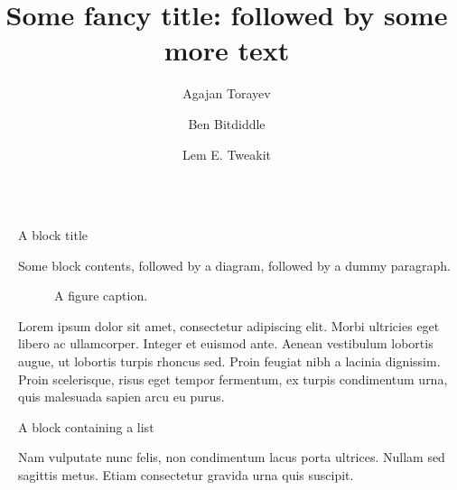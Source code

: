 \documentclass[final]{beamer}
\title{Some fancy title: followed by some more text}
\author{Agajan Torayev \inst{1} \and Ben Bitdiddle \inst{2} \and Lem E. Tweakit \inst{2}}
\institute[shortinst]{\inst{1} Some Institute \samelineand \inst{2} Another Institute}
\newlength{\sepwidth}
\newlength{\colwidth}
\newcommand{\separatorcolumn}{\begin{column}{\sepwidth}\end{column}}
\begin{document}

    \begin{frame}[t]
        \begin{columns}[t]
            \separatorcolumn

            \begin{column}{\colwidth}

                \begin{block}{A block title}

                    Some block contents, followed by a diagram, followed by a dummy paragraph.

                    \begin{figure}
                        \centering
                        \caption{A figure caption.}
                    \end{figure}

                    Lorem ipsum dolor sit amet, consectetur adipiscing elit. Morbi ultricies
                    eget libero ac ullamcorper. Integer et euismod ante. Aenean vestibulum
                    lobortis augue, ut lobortis turpis rhoncus sed. Proin feugiat nibh a
                    lacinia dignissim. Proin scelerisque, risus eget tempor fermentum, ex
                    turpis condimentum urna, quis malesuada sapien arcu eu purus.

                \end{block}

                \begin{block}{A block containing a list}

                    Nam vulputate nunc felis, non condimentum lacus porta ultrices. Nullam sed
                    sagittis metus. Etiam consectetur gravida urna quis suscipit.


\end{block}
\end{column}
\end{columns}
\end{frame}
\end{document}
